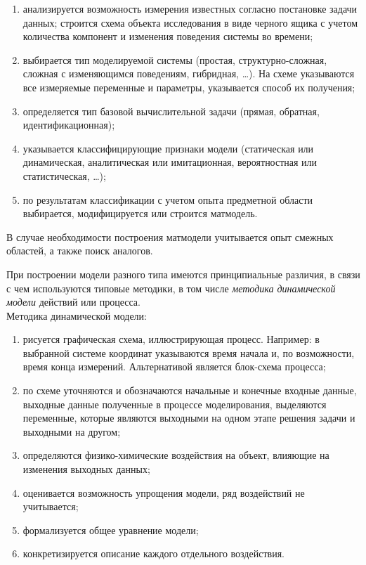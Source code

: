 \documentclass[12pt]{article}
\begin{document}
\begin{enumerate}
    \item анализируется возможность измерения известных согласно постановке задачи данных; строится схема объекта исследования в виде черного ящика с учетом количества компонент и изменения поведения системы во времени;
    \item выбирается тип моделируемой системы (простая, структурно-сложная, сложная с изменяющимся поведениям, гибридная, \ldots). На схеме указываются все измеряемые переменные и параметры, указывается способ их получения;
    \item определяется тип базовой вычислительной задачи (прямая, обратная, идентификационная);
    \item указывается классифицирующие признаки модели (статическая или динамическая, аналитическая или имитационная, вероятностная или статистическая, \ldots);
    \item по результатам классификации с учетом опыта предметной области выбирается, модифицируется или строится матмодель.
\end{enumerate}

В случае необходимости построения матмодели учитывается опыт смежных областей, а также поиск аналогов.

При построении модели разного типа имеются принципиальные различия, в связи с чем используются типовые методики, в том числе \emph{методика динамической модели} действий или процесса.\\

Методика динамической модели:
\begin{enumerate}
    \item рисуется графическая схема, иллюстрирующая процесс. Например: в выбранной системе координат указываются время начала и, по возможности, время конца измерений. Альтернативой является блок-схема процесса;
    \item по схеме уточняются и обозначаются начальные и конечные входные данные, выходные данные полученные в процессе моделирования, выделяются переменные, которые являются выходными на одном этапе решения задачи и выходными на другом;
    \item определяются физико-химические воздействия на объект, влияющие на изменения выходных данных;
    \item оценивается возможность упрощения модели, ряд воздействий не учитывается;
    \item формализуется общее уравнение модели;
    \item конкретизируется описание каждого отдельного воздействия.
\end{enumerate}
\end{document}
